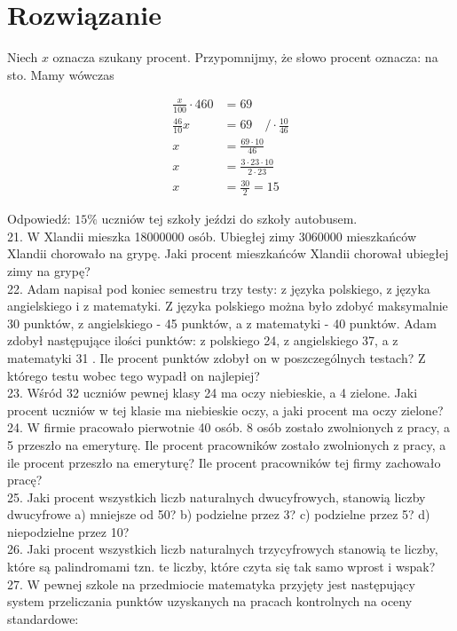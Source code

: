 \documentclass[10pt]{article}
\begin{document}
\section*{Rozwiązanie}
Niech \(x\) oznacza szukany procent. Przypomnijmy, że słowo procent oznacza: na sto. Mamy wówczas

\[
\begin{aligned}
\frac{x}{100} \cdot 460 & =69 \\
\frac{46}{10} x & =69 \quad / \cdot \frac{10}{46} \\
x & =\frac{69 \cdot 10}{46} \\
x & =\frac{3 \cdot 23 \cdot 10}{2 \cdot 23} \\
x & =\frac{30}{2}=15
\end{aligned}
\]

Odpowiedź: \(15 \%\) uczniów tej szkoły jeździ do szkoły autobusem.\\
21. W Xlandii mieszka 18000000 osób. Ubiegłej zimy 3060000 mieszkańców Xlandii chorowało na grypę. Jaki procent mieszkańców Xlandii chorował ubiegłej zimy na grypę?\\
22. Adam napisał pod koniec semestru trzy testy: z języka polskiego, z języka angielskiego i z matematyki. Z języka polskiego można było zdobyć maksymalnie 30 punktów, z angielskiego - 45 punktów, a z matematyki - 40 punktów. Adam zdobył następujące ilości punktów: z polskiego 24, z angielskiego 37, a z matematyki 31 . Ile procent punktów zdobył on w poszczególnych testach? Z którego testu wobec tego wypadł on najlepiej?\\
23. Wśród 32 uczniów pewnej klasy 24 ma oczy niebieskie, a 4 zielone. Jaki procent uczniów w tej klasie ma niebieskie oczy, a jaki procent ma oczy zielone?\\
24. W firmie pracowało pierwotnie 40 osób. 8 osób zostało zwolnionych z pracy, a 5 przeszło na emeryturę. Ile procent pracowników zostało zwolnionych z pracy, a ile procent przeszło na emeryturę? Ile procent pracowników tej firmy zachowało pracę?\\
25. Jaki procent wszystkich liczb naturalnych dwucyfrowych, stanowią liczby dwucyfrowe a) mniejsze od 50? b) podzielne przez 3? c) podzielne przez 5? d) niepodzielne przez 10?\\
26. Jaki procent wszystkich liczb naturalnych trzycyfrowych stanowią te liczby, które są palindromami tzn. te liczby, które czyta się tak samo wprost i wspak?\\
27. W pewnej szkole na przedmiocie matematyka przyjęty jest następujący system przeliczania punktów uzyskanych na pracach kontrolnych na oceny standardowe:
\end{document}
